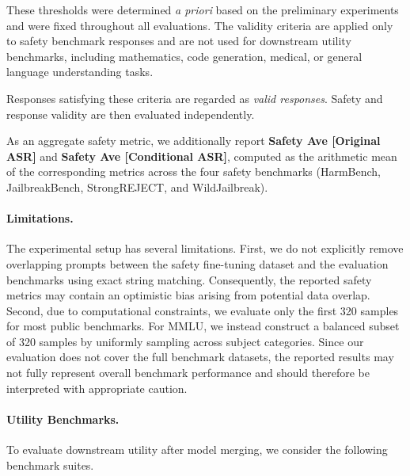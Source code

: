 \documentclass{article}
\begin{document}
These thresholds were determined \emph{a priori} based on the preliminary experiments and were fixed throughout all evaluations. The validity criteria are applied only to safety benchmark responses and are not used for downstream utility benchmarks, including mathematics, code generation, medical, or general language understanding tasks.

Responses satisfying these criteria are regarded as \emph{valid responses}. Safety and response validity are then evaluated independently.

As an aggregate safety metric, we additionally report \textbf{Safety Ave [Original ASR]} and \textbf{Safety Ave [Conditional ASR]}, computed as the arithmetic mean of the corresponding metrics across the four safety benchmarks (HarmBench, JailbreakBench, StrongREJECT, and WildJailbreak).

\paragraph{Limitations.}

The experimental setup has several limitations. First, we do not explicitly remove overlapping prompts between the safety fine-tuning dataset and the evaluation benchmarks using exact string matching. Consequently, the reported safety metrics may contain an optimistic bias arising from potential data overlap. Second, due to computational constraints, we evaluate only the first 320 samples for most public benchmarks. For MMLU, we instead construct a balanced subset of 320 samples by uniformly sampling across subject categories. Since our evaluation does not cover the full benchmark datasets, the reported results may not fully represent overall benchmark performance and should therefore be interpreted with appropriate caution.

\paragraph{Utility Benchmarks.}

To evaluate downstream utility after model merging, we consider the following benchmark suites.
\end{document}
